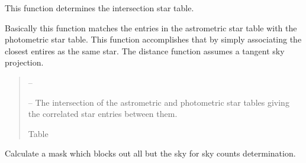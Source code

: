 \documentclass[letterpaper,11pt,english]{sphinxmanual}
\begin{document}
\begin{savenotes}
\begin{fulllineitems}
\begin{savenotes}
\begin{fulllineitems}
\begin{quote}
\begin{description}
\end{description}\end{quote}

\end{fulllineitems}\end{savenotes}


\begin{savenotes}\begin{fulllineitems}
\label{\detokenize{code/opihiexarata.photometry.solution:opihiexarata.photometry.solution.PhotometricSolution.__calculate_intersection_star_table}}
\pysigstartsignatures
{}
\pysigstopsignatures
\sphinxAtStartPar
This function determines the intersection star table.

\sphinxAtStartPar
Basically this function matches the entries in the astrometric star
table with the photometric star table. This function accomplishes that
by simply associating the closest entires as the same star. The
distance function assumes a tangent sky projection.
\begin{quote}\begin{description}
\sphinxAtStartPar
{} – 

\sphinxAtStartPar
{} – The intersection of the astrometric and photometric star tables
giving the correlated star entries between them.

\sphinxAtStartPar
Table

\end{description}\end{quote}

\end{fulllineitems}\end{savenotes}


\begin{savenotes}\begin{fulllineitems}
\label{\detokenize{code/opihiexarata.photometry.solution:opihiexarata.photometry.solution.PhotometricSolution.__calculate_sky_counts_mask}}
\pysigstartsignatures
{}
\pysigstopsignatures
\sphinxAtStartPar
Calculate a mask which blocks out all but the sky for sky counts
determination.


\end{fulllineitems}
\end{savenotes}
\end{fulllineitems}
\end{savenotes}
\end{document}
